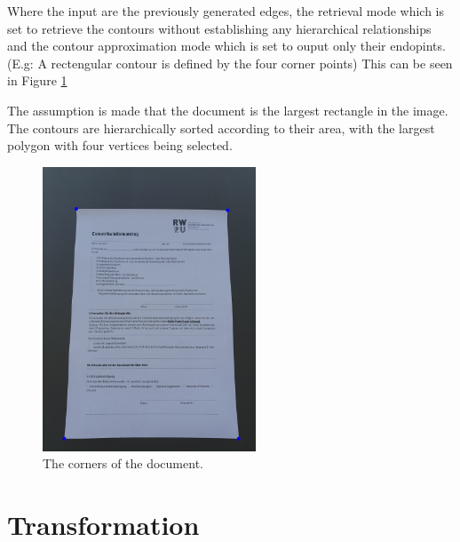 \documentclass[twocolumn,10pt]{asme2ej}
\begin{document}
Where the input are the previously generated edges, the retrieval 
mode\cite{opencv_retrievalmode} which is 
set to retrieve the contours without establishing any hierarchical relationships 
and the contour approximation mode\cite{opencv_approxmode} which is set to ouput only their endopints.
(E.g: A rectengular contour is defined by the four corner points)
This can be seen in Figure \ref{fig:contours}

The assumption is made that the document is the largest rectangle in the image.
The contours are hierarchically sorted according to their area, with the largest polygon with four vertices being selected.

\begin{figure}[H]
\centerline{\includegraphics[width=2.5in]{output/hoch_3_5_contouredimage.jpg}}
\caption{The corners of the document.}
\label{fig:contours}
\end{figure}

\cite{doi:10.3138/FM57-6770-U75U-7727}
\cite{RAMER1972244}




\section{Transformation}
\end{document}
